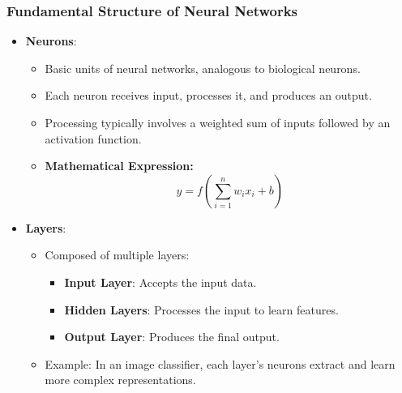 \documentclass[aspectratio=169]{beamer}
\begin{document}
\begin{frame}[fragile]
    \frametitle{Fundamental Structure of Neural Networks}
    \begin{itemize}
        \item \textbf{Neurons}:
        \begin{itemize}
            \item Basic units of neural networks, analogous to biological neurons.
            \item Each neuron receives input, processes it, and produces an output.
            \item Processing typically involves a weighted sum of inputs followed by an activation function.
            \item \textbf{Mathematical Expression:}
            \begin{equation}
                y = f\left(\sum_{i=1}^{n} w_i x_i + b\right)
            \end{equation}
        \end{itemize}
        
        \item \textbf{Layers}:
        \begin{itemize}
            \item Composed of multiple layers:
            \begin{itemize}
                \item \textbf{Input Layer}: Accepts the input data.
                \item \textbf{Hidden Layers}: Processes the input to learn features.
                \item \textbf{Output Layer}: Produces the final output.
            \end{itemize}
            \item Example: In an image classifier, each layer's neurons extract and learn more complex representations.
        \end{itemize}
    \end{itemize}
\end{frame}
\end{document}
